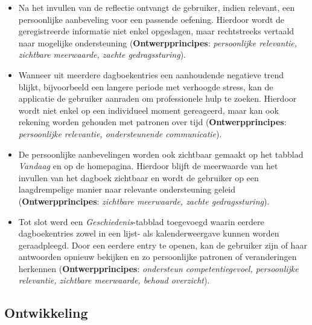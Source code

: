 {\begin{itemize}
        \item Na het invullen van de reflectie ontvangt de gebruiker, indien relevant, een persoonlijke aanbeveling voor een passende oefening. Hierdoor wordt de geregistreerde informatie niet enkel opgeslagen, maar rechtstreeks vertaald naar mogelijke ondersteuning (\textbf{Ontwerpprincipes}: \textit{persoonlijke relevantie, zichtbare meerwaarde, zachte gedragssturing}).
        
        \item Wanneer uit meerdere dagboekentries een aanhoudende negatieve trend blijkt, bijvoorbeeld een langere periode met verhoogde stress, kan de applicatie de gebruiker aanraden om professionele hulp te zoeken. Hierdoor wordt niet enkel op een individueel moment gereageerd, maar kan ook rekening worden gehouden met patronen over tijd (\textbf{Ontwerpprincipes}: \textit{persoonlijke relevantie, ondersteunende communicatie}).
        
        \item De persoonlijke aanbevelingen worden ook zichtbaar gemaakt op het tabblad \textit{Vandaag} en op de homepagina. Hierdoor blijft de meerwaarde van het invullen van het dagboek zichtbaar en wordt de gebruiker op een laagdrempelige manier naar relevante ondersteuning geleid (\textbf{Ontwerpprincipes}: \textit{zichtbare meerwaarde, zachte gedragssturing}).
        
        \item Tot slot werd een \textit{Geschiedenis}-tabblad toegevoegd waarin eerdere dagboekentries zowel in een lijst- als kalenderweergave kunnen worden geraadpleegd. Door een eerdere entry te openen, kan de gebruiker zijn of haar antwoorden opnieuw bekijken en zo persoonlijke patronen of veranderingen herkennen (\textbf{Ontwerpprincipes}: \textit{ondersteun competentiegevoel, persoonlijke relevantie, zichtbare meerwaarde, behoud overzicht}).
    \end{itemize}
}

\newpage


\subsection{Ontwikkeling}
\label{subsec:ontwikkeling-mockups}

